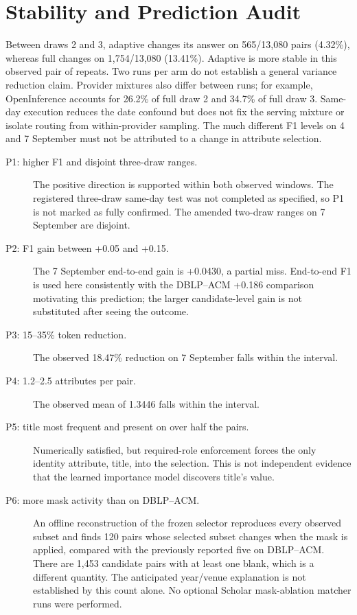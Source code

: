 \documentclass[11pt]{article}
\begin{document}
\section{Stability and Prediction Audit}
Between draws 2 and 3, adaptive changes its answer on 565/13,080 pairs (4.32\%),
whereas full changes on 1,754/13,080 (13.41\%). Adaptive is more stable in this
observed pair of repeats. Two runs per arm do not establish a general variance
reduction claim. Provider mixtures also differ between runs; for example,
OpenInference accounts for 26.2\% of full draw 2 and 34.7\% of full draw 3.
Same-day execution reduces the date confound but does not fix the serving mixture
or isolate routing from within-provider sampling. The much different F1 levels
on 4 and 7 September must not be attributed to a change in attribute selection.

\begin{description}
\item[P1: higher F1 and disjoint three-draw ranges.]
The positive direction is supported within both observed windows. The registered
three-draw same-day test was not completed as specified, so P1 is not marked as
fully confirmed. The amended two-draw ranges on 7 September are disjoint.
\item[P2: F1 gain between +0.05 and +0.15.]
The 7 September end-to-end gain is +0.0430, a partial miss. End-to-end F1 is used
here consistently with the DBLP--ACM +0.186 comparison motivating this prediction;
the larger candidate-level gain is not substituted after seeing the outcome.
\item[P3: 15--35\% token reduction.]
The observed 18.47\% reduction on 7 September falls within the interval.
\item[P4: 1.2--2.5 attributes per pair.]
The observed mean of 1.3446 falls within the interval.
\item[P5: title most frequent and present on over half the pairs.]
Numerically satisfied, but required-role enforcement forces the only identity
attribute, title, into the selection. This is not independent evidence that
the learned importance model discovers title's value.
\item[P6: more mask activity than on DBLP--ACM.]
An offline reconstruction of the frozen selector reproduces every observed
subset and finds 120 pairs whose selected subset changes when the mask is applied,
compared with the previously reported five on DBLP--ACM. There are 1,453 candidate
pairs with at least one blank, which is a different quantity. The anticipated
year/venue explanation is not established by this count alone. No optional
Scholar mask-ablation matcher runs were performed.
\end{description}
\end{document}
